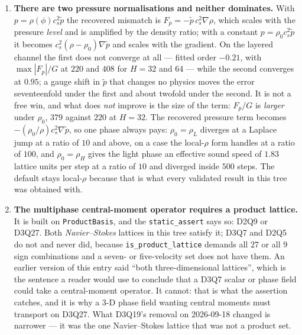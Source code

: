 \documentclass[11pt,a4paper]{article}
\newcommand{\code}[1]{\texttt{\small #1}}
\newcommand{\cs}{c_s}
\begin{document}
\begin{enumerate}[leftmargin=1.4em,itemsep=4pt]
\item \textbf{There are two pressure normalisations and neither dominates.} With
  $p = \rho(\phi)\cs^2\tilde p$ the recovered mismatch is
  $F_p = -\tilde p\,\cs^2\nabla\rho$, which scales with the pressure
  \emph{level} and is amplified by the density ratio; with a constant
  $p = \rho_0\cs^2\tilde p$ it becomes $\cs^2(\rho-\rho_0)\nabla\tilde p$ and
  scales with the gradient. On the layered channel the first does not converge
  at all --- fitted order $-0.21$, with $\max|F_p|/G$ at $220$ and $408$ for
  $H = 32$ and $64$ --- while the second converges at $0.95$; a gauge shift in
  $\tilde p$ that changes no physics moves the error seventeenfold under the
  first and about twofold under the second. It is not a free win, and what does
  \emph{not} improve is the size of the term: $F_p/G$ is \emph{larger} under
  $\rho_0$, $379$ against $220$ at $H = 32$. The recovered pressure term becomes
  $-(\rho_0/\rho)\cs^2\nabla\tilde p$, so one phase always pays: $\rho_0=\rho_L$
  diverges at a Laplace jump at a ratio of $10$ and above, on a case the
  local-$\rho$ form handles at a ratio of $100$, and $\rho_0=\rho_H$ gives the
  light phase an effective sound speed of $1.83$ lattice units per step at a
  ratio of $10$ and diverged inside $500$ steps. The default stays local-$\rho$
  because that is what every validated result in this tree was obtained with.

\item \textbf{The multiphase central-moment operator requires a product
  lattice.} It is built on \code{ProductBasis}, and the \code{static\_assert}
  says so: D2Q9 or D3Q27. Both \emph{Navier--Stokes} lattices in this tree satisfy
  it; D3Q7 and D2Q5 do not and never did, because \code{is\_product\_lattice}
  demands all $27$ or all $9$ sign combinations and a seven- or five-velocity set
  does not have them. An earlier version of this entry said ``both
  three-dimensional lattices'', which is the sentence a reader would use to
  conclude that a D3Q7 scalar or phase field could take a central-moment
  operator. It cannot: that is what the assertion catches, and it is why a 3-D
  phase field wanting central moments must transport on D3Q27. What D3Q19's
  removal on 2026-09-18 changed is narrower --- it was the one Navier--Stokes
  lattice that was not a product set.


\end{enumerate}
\end{document}
